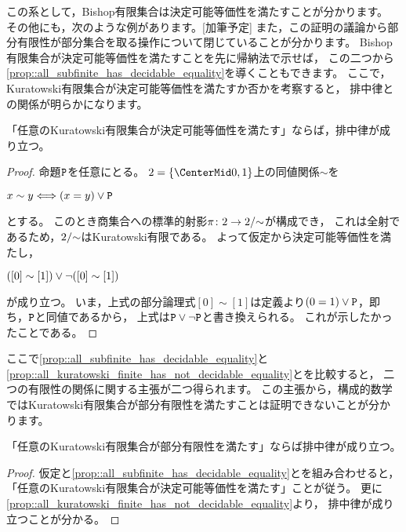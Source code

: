 この系として，Bishop有限集合は決定可能等価性を満たすことが分かります。
その他にも，次のような例があります。{\color{red}[加筆予定]}
また，この証明の議論から部分有限性が部分集合を取る操作について閉じていることが分かります。
Bishop有限集合が決定可能等価性を満たすことを先に帰納法で示せば，
この二つから\cref{prop::all_subfinite_has_decidable_equality}を導くこともできます。
ここで，Kuratowski有限集合が決定可能等価性を満たすか否かを考察すると，
排中律との関係が明らかになります。

\begin{proposition}\label{prop::all_kuratowski_finite_has_not_decidable_equality}
    「任意のKuratowski有限集合が決定可能等価性を満たす」ならば，排中律が成り立つ。
\end{proposition}

\begin{proof}
    命題\(\Proposition\)を任意にとる。
    \(\NaturalNumber<2>=\Set{0,1}\)上の同値関係\(\sim\)を
    \begin{center}
        \(\Element\sim\Element<y> \Longleftrightarrow (\Element=\Element<y>)\OR\Proposition\)
    \end{center}
    とする。
    このとき商集合への標準的射影\(\FunctionStyle{\Map<\pi>}{\NaturalNumber<2>}{\QuotientStyle{\NaturalNumber<2>}{\sim}}\)が構成でき，
    これは全射であるため，\(\QuotientStyle{\NaturalNumber<2>}{\sim}\)はKuratowski有限である。
    よって仮定から決定可能等価性を満たし，
    \begin{center}
        \(([0]\sim[1])\vee\neg([0]\sim[1])\)
    \end{center}
    が成り立つ。
    いま，上式の部分論理式\([0]\sim[1]\)は定義より\((0=1)\OR\Proposition\)，即ち，\(\Proposition\)と同値であるから，
    上式は\(\Proposition\OR\NOT\Proposition\)と書き換えられる。
    これが示したかったことである。
\end{proof}

ここで\cref{prop::all_subfinite_has_decidable_equality}と\cref{prop::all_kuratowski_finite_has_not_decidable_equality}とを比較すると，
二つの有限性の関係に関する主張が二つ得られます。
この主張から，構成的数学ではKuratowski有限集合が部分有限性を満たすことは証明できないことが分かります。

\begin{proposition}\label{prop::kuratowski_is_not_subfinite}
    「任意のKuratowski有限集合が部分有限性を満たす」ならば排中律が成り立つ。
\end{proposition}

\begin{proof}
    仮定と\cref{prop::all_subfinite_has_decidable_equality}とを組み合わせると，
    「任意のKuratowski有限集合が決定可能等価性を満たす」ことが従う。
    更に\cref{prop::all_kuratowski_finite_has_not_decidable_equality}より，
    排中律が成り立つことが分かる。
\end{proof}

